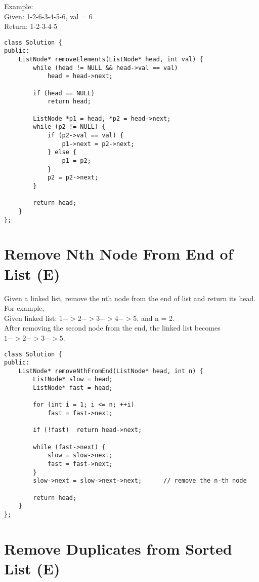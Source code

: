 Example:\\
Given: 1-2-6-3-4-5-6, val = 6\\
Return: 1-2-3-4-5 \\

\begin{lstlisting}
class Solution {
public:
    ListNode* removeElements(ListNode* head, int val) {
        while (head != NULL && head->val == val)
            head = head->next;
            
        if (head == NULL)
            return head;
        
        ListNode *p1 = head, *p2 = head->next;
        while (p2 != NULL) {
            if (p2->val == val) {
                p1->next = p2->next;
            } else {
                p1 = p2;
            }
            p2 = p2->next;
        }
        
        return head;
    }
};
\end{lstlisting}


\section{Remove Nth Node From End of List (E)}
Given a linked list, remove the nth node from the end of list and return its head.\\

For example,\\
   Given linked list: $1->2->3->4->5$, and n = 2.\\
   After removing the second node from the end, the linked list becomes $1->2->3->5$.\\

\begin{lstlisting}
class Solution {
public:
    ListNode* removeNthFromEnd(ListNode* head, int n) {
        ListNode* slow = head;
        ListNode* fast = head;
        
        for (int i = 1; i <= n; ++i)
            fast = fast->next;
            
        if (!fast)  return head->next;
        
        while (fast->next) {
            slow = slow->next;
            fast = fast->next;
        }
        slow->next = slow->next->next;      // remove the n-th node
        
        return head;
    }
};
\end{lstlisting}


\section{Remove Duplicates from Sorted List (E)}

